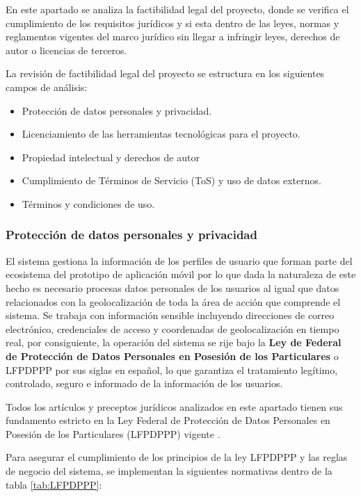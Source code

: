 En este apartado se analiza la factibilidad legal del proyecto, donde se verifica el cumplimiento de los requisitos jurídicos y si esta dentro de las leyes, normas y reglamentos vigentes del marco jurídico sin llegar a infringir leyes, derechos de autor o licencias de terceros.  

La revisión de factibilidad legal del proyecto se estructura en los siguientes campos de análisis: 

\begin{itemize}
    \item Protección de datos personales y privacidad.
    \item Licenciamiento de las herramientas tecnológicas para el proyecto.
    \item Propiedad intelectual y derechos de autor
    \item Cumplimiento de Términos de Servicio (ToS) y uso de datos externos.
    \item Términos y condiciones de uso. 
\end{itemize}

\subsubsection{Protección de datos personales y privacidad}

El sistema gestiona la información de los perfiles de usuario que forman parte del ecosistema del prototipo de aplicación móvil por lo que dada la naturaleza de este hecho es necesario procesas datos personales de los usuarios al igual que datos relacionados con la geolocalización de toda la área de acción que comprende el sistema. Se trabaja con información sensible incluyendo direcciones de correo electrónico, credenciales de acceso y coordenadas de geolocalización en tiempo real, por consiguiente, la operación del sistema se rije bajo la \textbf{Ley de Federal de Protección de Datos Personales en Posesión de los Particulares} o LFPDPPP por sus siglas en español, lo que garantiza el tratamiento legítimo, controlado, seguro e informado de la información de los usuarios. 

Todos los artículos y preceptos jurídicos analizados en este apartado tienen sus fundamento estricto en la Ley Federal de Protección de Datos Personales en Posesión de los Particulares (LFPDPPP) vigente \cite{LFPDPPP_2025}. 

Para asegurar el cumplimiento de los principios de la ley LFPDPPP y las reglas de negocio del sistema, se implementan la siguientes normativas dentro de la tabla \ref{tab:LFPDPPP}:

